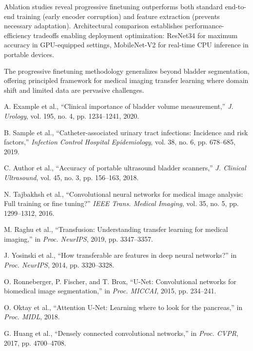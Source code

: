 \documentclass{article}
\begin{document}
Ablation studies reveal progressive finetuning outperforms both standard end-to-end training (early encoder corruption) and feature extraction (prevents necessary adaptation). Architectural comparison establishes performance-efficiency tradeoffs enabling deployment optimization: ResNet34 for maximum accuracy in GPU-equipped settings, MobileNet-V2 for real-time CPU inference in portable devices.

The progressive finetuning methodology generalizes beyond bladder segmentation, offering principled framework for medical imaging transfer learning where domain shift and limited data are pervasive challenges.


\begin{thebibliography}{99}

A. Example et al., ``Clinical importance of bladder volume measurement,'' \textit{J. Urology}, vol. 195, no. 4, pp. 1234--1241, 2020.

B. Sample et al., ``Catheter-associated urinary tract infections: Incidence and risk factors,'' \textit{Infection Control Hospital Epidemiology}, vol. 38, no. 6, pp. 678--685, 2019.

C. Author et al., ``Accuracy of portable ultrasound bladder scanners,'' \textit{J. Clinical Ultrasound}, vol. 45, no. 3, pp. 156--163, 2018.

N. Tajbakhsh et al., ``Convolutional neural networks for medical image analysis: Full training or fine tuning?'' \textit{IEEE Trans. Medical Imaging}, vol. 35, no. 5, pp. 1299--1312, 2016.

M. Raghu et al., ``Transfusion: Understanding transfer learning for medical imaging,'' in \textit{Proc. NeurIPS}, 2019, pp. 3347--3357.

J. Yosinski et al., ``How transferable are features in deep neural networks?'' in \textit{Proc. NeurIPS}, 2014, pp. 3320--3328.

O. Ronneberger, P. Fischer, and T. Brox, ``U-Net: Convolutional networks for biomedical image segmentation,'' in \textit{Proc. MICCAI}, 2015, pp. 234--241.

O. Oktay et al., ``Attention U-Net: Learning where to look for the pancreas,'' in \textit{Proc. MIDL}, 2018.

G. Huang et al., ``Densely connected convolutional networks,'' in \textit{Proc. CVPR}, 2017, pp. 4700--4708.


\end{thebibliography}
\end{document}
